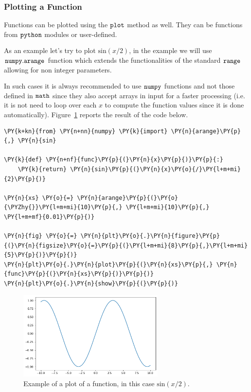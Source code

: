 \subsubsection{Plotting a Function}\label{plotting-a-function}

Functions can be plotted using the \(\tt{plot}\) method as well. They can be
functions from \(\tt{python}\) modules or user-defined.

As an example let's try to plot \(\mathrm{sin}(x/2)\), in the example we
will use \(\tt{numpy.arange}\) function which extends the functionalities
of the standard \(\tt{range}\) allowing for non integer parameters.

In such cases it is always recommended to use \(\tt{numpy}\) functions
and not those defined in \(\tt{math}\) since they also accept arrays in
input for a faster processing (i.e. it is not need to loop over each
\(x\) to compute the function values since it is done automatically).
Figure~\ref{fig:sinx_x} reports the result of the code below.

\begin{tcolorbox}[breakable, size=fbox, boxrule=1pt, pad at break*=1mm,colback=cellbackground, colframe=cellborder]
\begin{Verbatim}[commandchars=\\\{\}]
\PY{k+kn}{from} \PY{n+nn}{numpy} \PY{k}{import} \PY{n}{arange}\PY{p}{,} \PY{n}{sin}
	
\PY{k}{def} \PY{n+nf}{func}\PY{p}{(}\PY{n}{x}\PY{p}{)}\PY{p}{:}
    \PY{k}{return} \PY{n}{sin}\PY{p}{(}\PY{n}{x}\PY{o}{/}\PY{l+m+mi}{2}\PY{p}{)}
	
\PY{n}{xs} \PY{o}{=} \PY{n}{arange}\PY{p}{(}\PY{o}{\PYZhy{}}\PY{l+m+mi}{10}\PY{p}{,} \PY{l+m+mi}{10}\PY{p}{,} \PY{l+m+mf}{0.01}\PY{p}{)}
	
\PY{n}{fig} \PY{o}{=} \PY{n}{plt}\PY{o}{.}\PY{n}{figure}\PY{p}{(}\PY{n}{figsize}\PY{o}{=}\PY{p}{(}\PY{l+m+mi}{8}\PY{p}{,}\PY{l+m+mi}{5}\PY{p}{)}\PY{p}{)}
\PY{n}{plt}\PY{o}{.}\PY{n}{plot}\PY{p}{(}\PY{n}{xs}\PY{p}{,} \PY{n}{func}\PY{p}{(}\PY{n}{xs}\PY{p}{)}\PY{p}{)}
\PY{n}{plt}\PY{o}{.}\PY{n}{show}\PY{p}{(}\PY{p}{)}
\end{Verbatim}
\end{tcolorbox}

\begin{figure}[htb]
	\centering
	\includegraphics[width=0.65\textwidth]{figures/sinx_x}
	\caption{Example of a plot of a function, in this case \(\mathrm{sin}(x/2)\).}
	\label{fig:sinx_x}
\end{figure}


